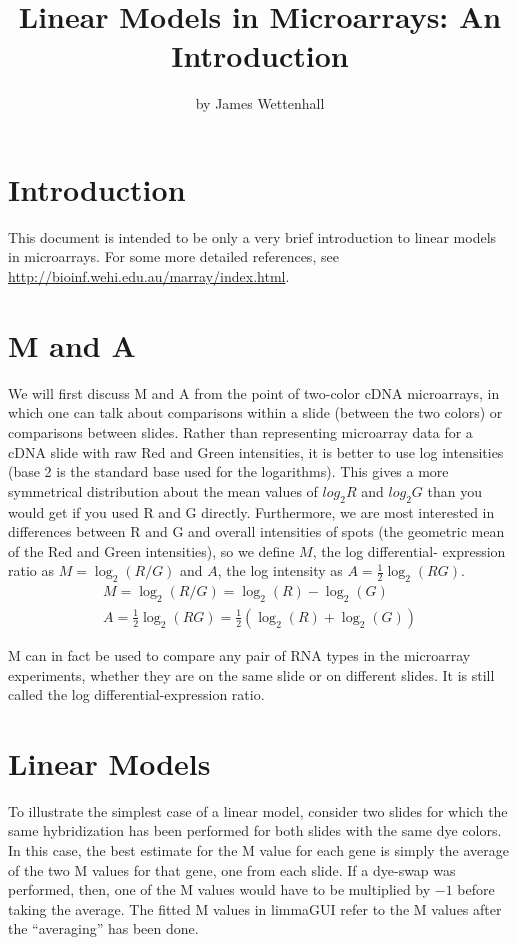 \documentclass[a4paper,english,12pt]{article}
\begin{document}
\title{Linear Models in Microarrays: An Introduction}
\author{by James Wettenhall}
\maketitle
\section{Introduction}
This document is intended to be only a very brief introduction to linear models in microarrays.  For some more detailed
references, see \\
\url{http://bioinf.wehi.edu.au/marray/index.html}.

\section{M and A}
We will first discuss M and A from the point of two-color cDNA microarrays, in which one can talk about comparisons
within a slide (between the two colors) or comparisons between slides.  Rather than representing microarray data for
a cDNA slide with raw Red and Green intensities, it is better to use log intensities (base 2 is the standard base used
for the logarithms).  This gives a more symmetrical distribution about the mean values of $log_{2}R$ and $log_{2}G$ than 
you would get if you used R and G directly.  Furthermore, we are most interested in differences between R and G and
overall intensities of spots (the geometric mean of the Red and Green intensities), so we define $M$, the log differential- 
expression ratio as $M=\log_2(R/G)$ and $A$, the log intensity as $A=\frac{1}{2} \log_2(RG)$. \\

\begin{eqnarray}
M=\log_2(R/G) = \log_2(R) - \log_2(G) \\
A=\frac{1}{2} \log_2(RG) = \frac{1}{2} (\log_2(R) + \log_2(G))
\end{eqnarray}

M can in fact be used to compare any pair of RNA types in the microarray experiments, whether they
are on the same slide or on different slides.  It is still called the log differential-expression
ratio.\\

\section{Linear Models}
To illustrate the simplest case of a linear model, consider two slides for which the same hybridization has been
performed for both slides with the same dye colors.  In this case, the best estimate for the M value for each
gene is simply the average of the two M values for that gene, one from each slide.  If a dye-swap was performed,
then, one of the M values would have to be multiplied by $-1$ before taking the average.  The fitted M values
in limmaGUI refer to the M values after the ``averaging'' has been done.\\
\end{document}
